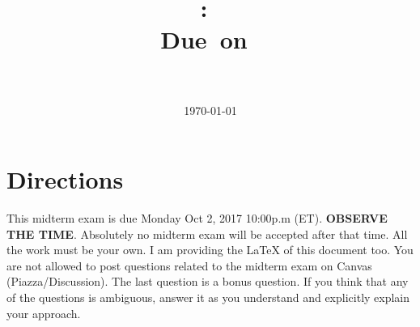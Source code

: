 \documentclass{article}
\title{
\vspace{2in}
\textmd{\textbf{\hmwkClass:\ \hmwkTitle}}\\
\normalsize\vspace{0.1in}\small{Due\ on\ \hmwkDueDate}\\
\vspace{0.1in}\large{\textit{\hmwkClassInstructor\ }}
\vspace{3in}
}
\author{\textbf{\hmwkAuthorName}}
\date{\today} %
\begin{document}
\maketitle



\newpage

\section*{Directions}
This midterm exam is due Monday Oct 2, 2017 10:00p.m (ET). \textbf{OBSERVE THE  TIME}. Absolutely
no midterm exam will be accepted after that time. All the work must be your own.  I am providing the \LaTeX{} of this document too. You are not allowed to post questions related  to the midterm exam  on Canvas (Piazza/Discussion). The last question is a bonus question. If you think that  any of the questions is ambiguous, answer it as you understand and explicitly explain your approach.

\end{document}
